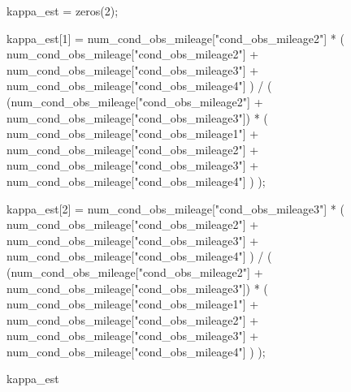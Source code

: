 \documentclass[
  letterpaper,
  DIV=11,
  numbers=noendperiod]{scrreprt}
\newenvironment{Shaded}{\begin{snugshade}}{\end{snugshade}}
\newcommand{\FloatTok}[1]{\textcolor[rgb]{0.68,0.00,0.00}{#1}}
\newcommand{\FunctionTok}[1]{\textcolor[rgb]{0.28,0.35,0.67}{#1}}
\newcommand{\NormalTok}[1]{\textcolor[rgb]{0.00,0.23,0.31}{#1}}
\newcommand{\OperatorTok}[1]{\textcolor[rgb]{0.37,0.37,0.37}{#1}}
\newcommand{\StringTok}[1]{\textcolor[rgb]{0.13,0.47,0.30}{#1}}
\begin{document}
\begin{Shaded}
\begin{Highlighting}[]
\NormalTok{kappa\_est }\OperatorTok{=} \FunctionTok{zeros}\NormalTok{(}\FloatTok{2}\NormalTok{);}

\NormalTok{kappa\_est[}\FloatTok{1}\NormalTok{] }\OperatorTok{=}\NormalTok{ num\_cond\_obs\_mileage[}\StringTok{"cond\_obs\_mileage2"}\NormalTok{] }\OperatorTok{*}\NormalTok{ (}
\NormalTok{    num\_cond\_obs\_mileage[}\StringTok{"cond\_obs\_mileage2"}\NormalTok{] }\OperatorTok{+}
\NormalTok{    num\_cond\_obs\_mileage[}\StringTok{"cond\_obs\_mileage3"}\NormalTok{] }\OperatorTok{+}
\NormalTok{    num\_cond\_obs\_mileage[}\StringTok{"cond\_obs\_mileage4"}\NormalTok{]}
\NormalTok{) }\OperatorTok{/}\NormalTok{ (}
\NormalTok{    (num\_cond\_obs\_mileage[}\StringTok{"cond\_obs\_mileage2"}\NormalTok{] }\OperatorTok{+}\NormalTok{ num\_cond\_obs\_mileage[}\StringTok{"cond\_obs\_mileage3"}\NormalTok{]) }\OperatorTok{*}\NormalTok{ (}
\NormalTok{    num\_cond\_obs\_mileage[}\StringTok{"cond\_obs\_mileage1"}\NormalTok{] }\OperatorTok{+}
\NormalTok{    num\_cond\_obs\_mileage[}\StringTok{"cond\_obs\_mileage2"}\NormalTok{] }\OperatorTok{+}
\NormalTok{    num\_cond\_obs\_mileage[}\StringTok{"cond\_obs\_mileage3"}\NormalTok{] }\OperatorTok{+}
\NormalTok{    num\_cond\_obs\_mileage[}\StringTok{"cond\_obs\_mileage4"}\NormalTok{]}
\NormalTok{    )}
\NormalTok{);}

\NormalTok{kappa\_est[}\FloatTok{2}\NormalTok{] }\OperatorTok{=}\NormalTok{ num\_cond\_obs\_mileage[}\StringTok{"cond\_obs\_mileage3"}\NormalTok{] }\OperatorTok{*}\NormalTok{ (}
\NormalTok{    num\_cond\_obs\_mileage[}\StringTok{"cond\_obs\_mileage2"}\NormalTok{] }\OperatorTok{+}
\NormalTok{    num\_cond\_obs\_mileage[}\StringTok{"cond\_obs\_mileage3"}\NormalTok{] }\OperatorTok{+}
\NormalTok{    num\_cond\_obs\_mileage[}\StringTok{"cond\_obs\_mileage4"}\NormalTok{]}
\NormalTok{) }\OperatorTok{/}\NormalTok{ (}
\NormalTok{    (num\_cond\_obs\_mileage[}\StringTok{"cond\_obs\_mileage2"}\NormalTok{] }\OperatorTok{+}\NormalTok{ num\_cond\_obs\_mileage[}\StringTok{"cond\_obs\_mileage3"}\NormalTok{]) }\OperatorTok{*}\NormalTok{ (}
\NormalTok{    num\_cond\_obs\_mileage[}\StringTok{"cond\_obs\_mileage1"}\NormalTok{] }\OperatorTok{+}
\NormalTok{    num\_cond\_obs\_mileage[}\StringTok{"cond\_obs\_mileage2"}\NormalTok{] }\OperatorTok{+}
\NormalTok{    num\_cond\_obs\_mileage[}\StringTok{"cond\_obs\_mileage3"}\NormalTok{] }\OperatorTok{+}
\NormalTok{    num\_cond\_obs\_mileage[}\StringTok{"cond\_obs\_mileage4"}\NormalTok{]}
\NormalTok{    )}
\NormalTok{);}

\NormalTok{kappa\_est}
\end{Highlighting}
\end{Shaded}
\end{document}
